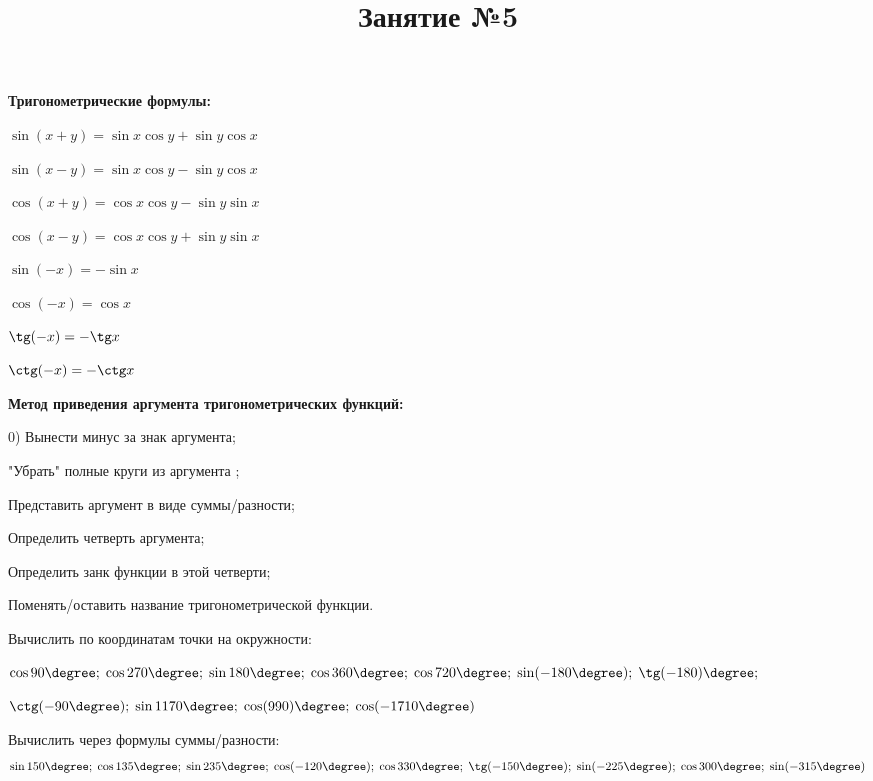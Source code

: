 %
\newpage
\title{Занятие №5}
\begin{listofex}
	\item \textbf{Тригонометрические формулы:}
	\begin{enumcols}[itemcolumns=2]
		\item \( \sin(x+y)=\sin x\cos y + \sin y \cos x \)
		\item \( \sin(x-y)=\sin x\cos y - \sin y \cos x \)
		\item \( \cos(x+y)=\cos x\cos y - \sin y \sin x \)
		\item \( \cos(x-y)=\cos x\cos y + \sin y \sin x \)
		\item \( \sin(-x)=-\sin x \)
		\item \( \cos(-x)=\cos x \)
		\item \( \tg(-x)=-\tg x \)
		\item \( \ctg(-x)=-\ctg x \)
	\end{enumcols}
	\item \textbf{Метод приведения аргумента тригонометрических функций:}
	\begin{enumcols}[itemcolumns=1]
		\item[0)] Вынести минус за знак аргумента;
		\item "Убрать" полные круги из аргумента ;
		\item Представить аргумент в виде суммы/разности;
		\item Определить четверть аргумента;
		\item Определить занк функции в этой четверти;
		\item Поменять/оставить название тригонометрической функции.
	\end{enumcols}
	\item Вычислить по координатам точки на окружности:
	\begin{enumcols}[itemcolumns=1]
		\item \( \cos90\degree;\;\cos270\degree;\;\sin 180\degree;\;\cos360\degree;\;\cos720\degree;\;\sin(-180\degree);\;\tg(-180)\degree; \)
		\item \( \ctg(-90\degree);\;\sin1170\degree;\;\cos(990)\degree;\;\cos(-1710\degree) \)
	\end{enumcols}
	\item Вычислить через формулы суммы/разности:
	\[ \sin150\degree;\;\cos135\degree;\;\sin235\degree;\;\cos(-120\degree);\;\cos330\degree;\;\tg(-150\degree);\;\sin(-225\degree);\;\cos300\degree;\;\sin(-315\degree) \]

\end{listofex}
